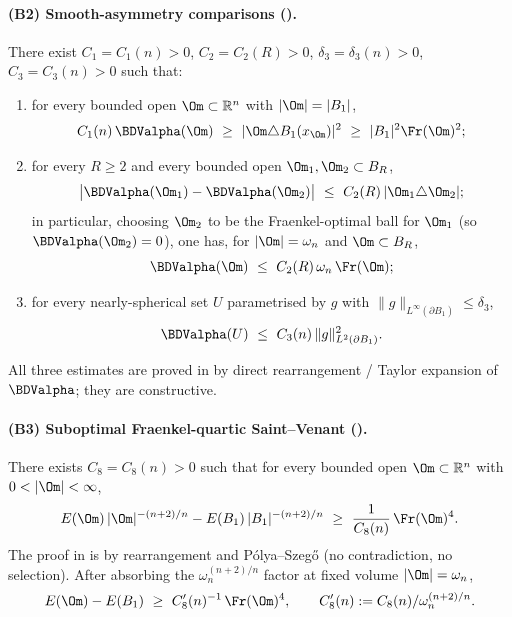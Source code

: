 \paragraph{(B2) Smooth-asymmetry comparisons \textnormal{(\cite[Lemma~4.2 (i),(ii),(iii)]{BDV})}.}
There exist $C_{1}=C_{1}(n)>0$, $C_{2}=C_{2}(R)>0$,
$\delta_{3}=\delta_{3}(n)>0$, $C_{3}=C_{3}(n)>0$ such that:
\begin{enumerate}
\item[\textup{(i)}]
   for every bounded open $\Om\subset\mathbb{R}^{n}$ with
   $|\Om|=|B_{1}|$,
   \begin{equation}\label{eq:plan1-42i}
      C_{1}(n)\,\BDValpha(\Om)\ \ge\ |\Om\triangle B_{1}(x_{\Om})|^{2}
      \ \ge\ |B_{1}|^{2}\Fr(\Om)^{2};
   \end{equation}
\item[\textup{(ii)}]
   for every $R\ge 2$ and every bounded open
   $\Om_{1},\Om_{2}\subset B_{R}$,
   \begin{equation}\label{eq:plan1-42ii}
      \bigl|\BDValpha(\Om_{1})-\BDValpha(\Om_{2})\bigr|
      \ \le\ C_{2}(R)\,|\Om_{1}\triangle\Om_{2}|;
   \end{equation}
   in particular, choosing $\Om_{2}$ to be the Fraenkel-optimal ball for
   $\Om_{1}$ (so $\BDValpha(\Om_{2})=0$), one has, for
   $|\Om|=\omega_{n}$ and $\Om\subset B_{R}$,
   \begin{equation}\label{eq:plan1-42ii-Fr}
      \BDValpha(\Om)\ \le\ C_{2}(R)\,\omega_{n}\,\Fr(\Om);
   \end{equation}
\item[\textup{(iii)}]
   for every nearly-spherical set $U$ parametrised by $g$ with
   $\|g\|_{L^{\infty}(\partial B_{1})}\le\delta_{3}$,
   \begin{equation}\label{eq:plan1-42iii}
      \BDValpha(U)\ \le\ C_{3}(n)\,\|g\|_{L^{2}(\partial B_{1})}^{2}.
   \end{equation}
\end{enumerate}
All three estimates are proved in \cite[\S4]{BDV} by direct
rearrangement / Taylor expansion of $\BDValpha$; they are constructive.

\paragraph{(B3) Suboptimal Fraenkel-quartic Saint--Venant
\textnormal{(\cite[Lemma~5.2]{BDV})}.}
There exists $C_{8}=C_{8}(n)>0$ such that for every bounded open
$\Om\subset\mathbb{R}^{n}$ with $0<|\Om|<\infty$,
\begin{equation}\label{eq:plan1-52-raw}
   E(\Om)\,|\Om|^{-(n+2)/n}-E(B_{1})\,|B_{1}|^{-(n+2)/n}
   \ \ge\ \frac{1}{C_{8}(n)}\,\Fr(\Om)^{4}.
\end{equation}
The proof in \cite[\S5]{BDV} is by rearrangement and
P\'olya--Szeg\H{o} (no contradiction, no selection). After absorbing the
$\omega_{n}^{(n+2)/n}$ factor at fixed volume $|\Om|=\omega_{n}$,
\begin{equation}\label{eq:plan1-52-fixed}
   E(\Om)-E(B_{1})\ \ge\
   C_{8}'(n)^{-1}\,\Fr(\Om)^{4},
   \qquad C_{8}'(n):=C_{8}(n)/\omega_{n}^{(n+2)/n}.
\end{equation}

